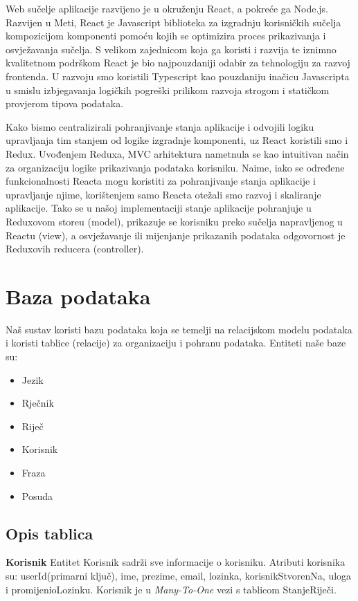 Web sučelje aplikacije razvijeno je u okruženju React, a pokreće ga Node.js. Razvijen u Meti, React je Javascript biblioteka za izgradnju korisničkih sučelja kompozicijom komponenti pomoću kojih se optimizira proces prikazivanja i osvježavanja sučelja. S velikom zajednicom koja ga koristi i razvija te iznimno kvalitetnom podrškom React je bio najpouzdaniji odabir za tehnologiju za razvoj frontenda. U razvoju smo koristili Typescript kao pouzdaniju inačicu Javascripta u smislu izbjegavanja logičkih pogreški prilikom razvoja strogom i statičkom provjerom tipova podataka.

Kako bismo centralizirali pohranjivanje stanja aplikacije i odvojili logiku upravljanja tim stanjem od logike izgradnje komponenti, uz React koristili smo i Redux. Uvođenjem Reduxa, MVC arhitektura nametnula se kao intuitivan način za organizaciju logike prikazivanja podataka korisniku. Naime, iako se određene funkcionalnosti Reacta mogu koristiti za pohranjivanje stanja aplikacije i upravljanje njime, korištenjem samo Reacta otežali smo razvoj i skaliranje aplikacije. Tako se u našoj implementaciji stanje aplikacije pohranjuje u Reduxovom storeu (model), prikazuje se korisniku preko sučelja napravljenog u Reactu (view), a osvježavanje ili mijenjanje prikazanih podataka odgovornost je Reduxovih reducera (controller).

		\section{Baza podataka}

		Naš sustav koristi bazu podataka koja se temelji na relacijskom modelu podataka i koristi tablice (relacije) za organizaciju i pohranu podataka. Entiteti naše baze su: 
		\begin{itemize}
			\item Jezik
			\item Rječnik
			\item Riječ
			\item Korisnik
			\item Fraza
			\item Posuda
		\end{itemize}
		
			\subsection{Opis tablica}
			

				\textbf{Korisnik} Entitet Korisnik sadrži sve informacije o korisniku. Atributi korisnika su: userId(primarni ključ), ime, prezime, email, lozinka, korisnikStvorenNa, uloga i promijenioLozinku. Korisnik je u \textit{Many-To-One} vezi s tablicom StanjeRiječi.
				
